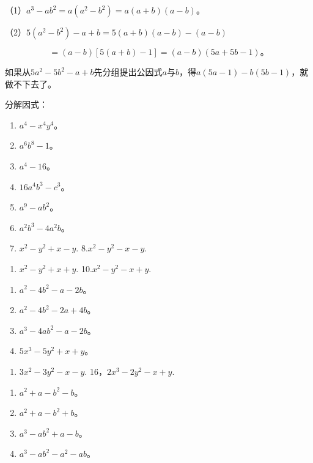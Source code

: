  （1）\(a^3 - ab^2 = a(a^2 - b^2) = a(a + b)(a - b)\)。

（2）\(5(a^{2} - b^{2}) - a + b = 5(a + b)(a - b) - (a - b)\)

\[
= (a - b) [ 5 (a + b) - 1 ] = (a - b) (5 a + 5 b - 1)\text{。}
\]

如果从\(5a^{2} - 5b^{2} - a + b\)先分组提出公因式\(a\)与\(b\)，得\(a(5a - 1) - b(5b - 1)\)，就做不下去了。

分解因式：

\begin{enumerate}[start=1]
\item
  \(a^4 - x^4 y^4\)。
\item
  \(a^6 b^8 - 1\)。
\item
  \(a^4 - 16\)。
\item
  \(16a^4b^3 - c^3\)。
\item
  \(a^9 - ab^2\)。
\item
  \(a^2b^3 - 4a^2b\)。
\item
  \(x^{2} - y^{2} + x - y.\) 8.\(x^{2} - y^{2} - x - y.\)
\end{enumerate}

\begin{enumerate}[start=9]
\item
  \(x^{2} - y^{2} + x + y.\) 10.\(x^{2} - y^{2} - x + y.\)
\end{enumerate}

\begin{enumerate}[start=11]
\item
  \(a^2 - 4b^2 - a - 2b\)。
\item
  \(a^2 - 4b^2 - 2a + 4b\)。
\item
  \(a^3 - 4ab^2 - a - 2b\)。
\item
  \(5x^3 - 5y^2 + x + y\)。
\end{enumerate}

\begin{enumerate}[start=15]
\item
  \(3x^{2} - 3y^{2} - x - y.\) 16，\(2x^{3} - 2y^{2} - x + y.\)
\end{enumerate}
\begin{enumerate}[start=17]
\item
  \(a^2 + a - b^2 - b\)。
\item
  \(a^2 + a - b^2 + b\)。
\item
  \(a^3 - ab^2 + a - b\)。
\item
  \(a^3 - ab^2 - a^2 - ab\)。
\end{enumerate}

